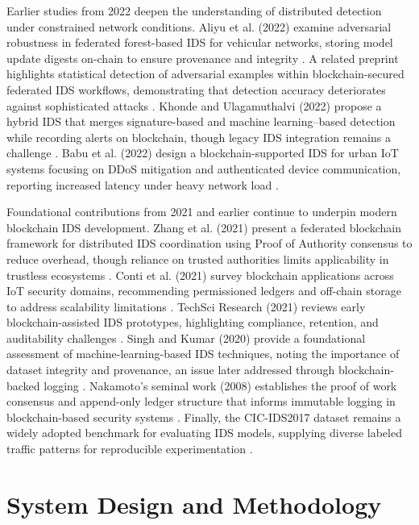\documentclass[conference]{IEEEtran}
\begin{document}
Earlier studies from 2022 deepen the understanding of distributed detection under constrained network conditions. Aliyu et al. (2022) examine adversarial robustness in federated forest-based IDS for vehicular networks, storing model update digests on-chain to ensure provenance and integrity \cite{aliyu2022bff}. A related preprint highlights statistical detection of adversarial examples within blockchain-secured federated IDS workflows, demonstrating that detection accuracy deteriorates against sophisticated attacks \cite{statadv2022arxiv}. Khonde and Ulagamuthalvi (2022) propose a hybrid IDS that merges signature-based and machine learning--based detection while recording alerts on blockchain, though legacy IDS integration remains a challenge \cite{khonde2022hybrid}. Babu et al. (2022) design a blockchain-supported IDS for urban IoT systems focusing on DDoS mitigation and authenticated device communication, reporting increased latency under heavy network load \cite{babu2022blockchain}.

Foundational contributions from 2021 and earlier continue to underpin modern blockchain IDS development. Zhang et al. (2021) present a federated blockchain framework for distributed IDS coordination using Proof of Authority consensus to reduce overhead, though reliance on trusted authorities limits applicability in trustless ecosystems \cite{zhang2021federated}. Conti et al. (2021) survey blockchain applications across IoT security domains, recommending permissioned ledgers and off-chain storage to address scalability limitations \cite{conti2021blockchain}. TechSci Research (2021) reviews early blockchain-assisted IDS prototypes, highlighting compliance, retention, and auditability challenges \cite{techsci2021review}. Singh and Kumar (2020) provide a foundational assessment of machine-learning-based IDS techniques, noting the importance of dataset integrity and provenance, an issue later addressed through blockchain-backed logging \cite{singh2020survey}. Nakamoto's seminal work (2008) establishes the proof of work consensus and append-only ledger structure that informs immutable logging in blockchain-based security systems \cite{nakamoto2008bitcoin}. Finally, the CIC-IDS2017 dataset remains a widely adopted benchmark for evaluating IDS models, supplying diverse labeled traffic patterns for reproducible experimentation \cite{cic2017}.

\section{System Design and Methodology}
\end{document}
